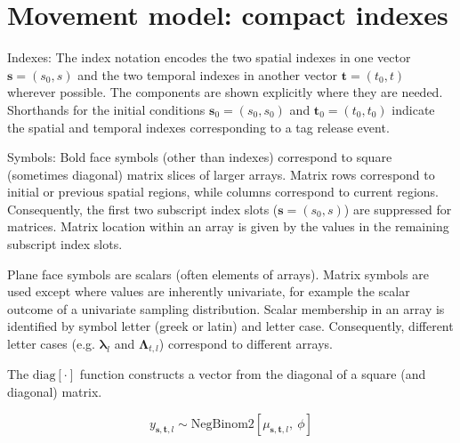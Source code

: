 \documentclass{article}
\begin{document}
\newpage

\section{Movement model: compact indexes}

\noindent Indexes: The index notation encodes the two spatial indexes in one vector $\boldsymbol{s} = \left( s_0,s \right)$ and the two temporal indexes in another vector $\boldsymbol{t} = \left( t_0, t \right)$ wherever possible. The components are shown explicitly where they are needed. Shorthands for the initial conditions $\boldsymbol{s}_0 = (s_0,s_0)$ and $\boldsymbol{t}_0 = (t_0,t_0)$ indicate the spatial and temporal indexes corresponding to a tag release event.
\newline

\noindent Symbols: Bold face symbols (other than indexes) correspond to square (sometimes diagonal) matrix slices of larger arrays. Matrix rows correspond to initial or previous spatial regions, while columns correspond to current regions. Consequently, the first two subscript index slots ($\boldsymbol{s} = (s_0, s)$) are suppressed for matrices. Matrix location within an array is given by the values in the remaining subscript index slots. 

Plane face symbols are scalars (often elements of arrays). Matrix symbols are used except where values are inherently univariate, for example the scalar outcome of a univariate sampling distribution. Scalar membership in an array is identified by symbol letter (greek or latin) and letter case. Consequently, different letter cases (e.g. $\boldsymbol{\lambda}_{l}$ and $\boldsymbol{\Lambda}_{t,l}$) correspond to different arrays.

The $\mathrm{diag} \! \left[ \cdot \right]$ function constructs a vector from the diagonal of a square (and diagonal) matrix.


\begin{equation}
  \label{eq:model-sampling}
  y_{\boldsymbol{s}, \boldsymbol{t},l} \sim \mathrm{NegBinom2} \!
    \left[\mu_{\boldsymbol{s}, \boldsymbol{t},l} \mathrm{,} \: \phi \right]
\end{equation}

\end{document}

